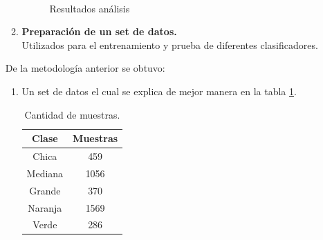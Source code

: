 \documentclass[twoside,spanish,ESP,MSc]{plantillaLabUPV}
\theoremstyle{definition}
\begin{document}
\begin{enumerate}
\begin{enumerate}
\begin{figure}[!h]
		\\
		\caption{Resultados análisis}
		\label{anali}
	\end{figure}
	
	\item \textbf{Preparación de un set de datos.}\\Utilizados para el entrenamiento y prueba de diferentes clasificadores.
\end{enumerate}

De la metodología anterior se obtuvo:
\begin{enumerate}
	\item Un set de datos el cual se explica de mejor manera en la tabla \ref{datiquis}.
	
	\begin{table}[!h]
		\caption{Cantidad de muestras.}
		\label{datiquis}
		\centering
		\begin{tabular}{|c|c|}
			\hline
			\textbf{Clase} & \textbf{Muestras} \\ \hline
			Chica          & 459               \\ \hline
			Mediana        & 1056              \\ \hline
			Grande         & 370               \\ \hline
			Naranja        & 1569              \\ \hline
			Verde          & 286               \\ \hline
		\end{tabular}
	\end{table}
	

\end{enumerate}
\end{enumerate}
\end{document}
